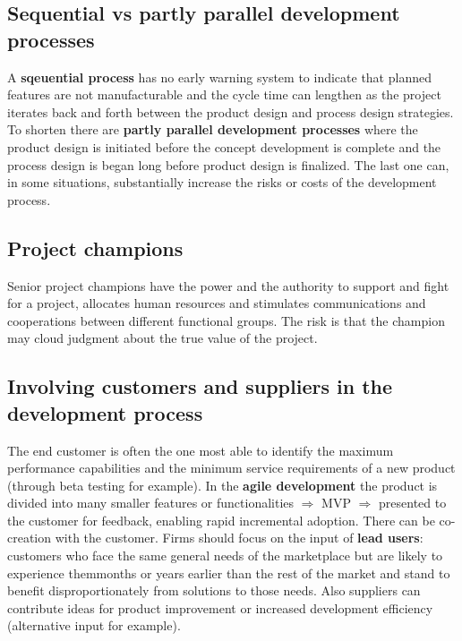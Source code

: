 \documentclass[12pt]{article}
\begin{document}
\subsection{Sequential vs partly parallel development processes}
A \textbf{sqeuential process} has no early warning system to indicate that planned features are not manufacturable and the cycle time can lengthen as the project iterates back and forth between the product design and process design strategies.
To shorten there are \textbf{partly parallel development processes} where the product design is initiated before the concept development is complete and the process design is began long before product design is finalized.
The last one can, in some situations, substantially increase the risks or costs of the development process.

\subsection{Project champions}
Senior project champions have the power and the authority to support and fight for a project, allocates human resources and stimulates communications and cooperations between different functional groups.
The risk is that the champion may cloud judgment about the true value of the project.

\subsection{Involving customers and suppliers in the development process}
The end customer is often the one most able to identify the maximum performance capabilities and the minimum service requirements of a new product (through beta testing for example).
In the \textbf{agile development} the product is divided into many smaller features or functionalities $\Rightarrow$ MVP $\Rightarrow$ presented to the customer  for feedback, enabling rapid incremental adoption. There can be co-creation with the customer.
Firms should focus on the input of \textbf{lead users}: customers who face the same general needs of the marketplace but are likely to experience themmonths or years earlier than the rest of the market and stand to benefit disproportionately from solutions to those needs.
Also suppliers can contribute ideas for product improvement or increased development efficiency (alternative input for example).
\end{document}
